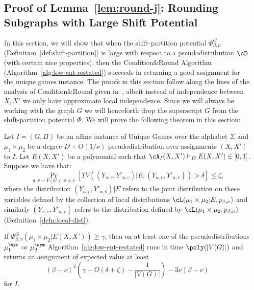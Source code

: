 \subsection{Proof of Lemma~\ref{lem:round-j}: Rounding Subgraphs with Large Shift Potential}
\label{sec:low-ent-j}
In this section, we will show that when the shift-partition potential $\Phi^G_{\beta,\nu}$ (Definition~\ref{def:shift-partition}) is large with respect to a pseudodistribution $\cD$ (with certain nice properties), then the Condition\&Round Algorithm  (Algorithm~\ref{alg:low-ent-restated}) succeeds in returning a good assignment for the unique games instance. The proofs in this section follow along the lines of the analysis of Condition\&Round given in~\cite{BBKSS}, albeit instead of independence between $X,X'$ we only have approximate local independence. Since we will always be working with the graph $G$ we will henceforth drop the superscript $G$ from the shift-partition potential $\Phi$.
We will prove the following theorem in this section:

\begin{lemma}\label{thm:round-j}
Let $I = (G, \Pi)$ be an affine instance of Unique Games over the alphabet $\Sigma$ and $\mu_1 \times \mu_2$ be a degree $D+\widetilde{O}(1/\nu)$ pseudodistribution over assignments $(X,X')$ to $I$. Let $E(X,X')$ be a polynomial such that $\cA_I(X,X') \vdash_D E(X,X') \in [0,1]$. Suppose we have that: 
\[\Pr_{u,v \sim V(G): u \neq v}[TV((Y_{u,v},Y'_{u,v})|E , (Y_{u,v},Y'_{u,v})) > \delta] \leq \zeta,\]
where the distribution $(Y_{u,v},Y'_{u,v})|E$ refers to the joint distribution on these variables defined by the collection of local distributions $\cL(\mu_1 \times \mu_2|E, p_{\beta,\nu})$ and similarly $(Y_{u,v},Y'_{u,v})$ refers to the distribution defined by $\cL(\mu_1 \times \mu_2,p_{\beta,\nu})$ (Definition~\ref{defn:local-dist}). 

If $\Phi^G_{\beta,\nu}(\mu_1 \times \mu_2 | E(X,X')) \geq \gamma$, then on at least one of the pseudodistributions $\mu^\sym_1$ or $\mu^\sym_2$ Algorithm~\ref{alg:low-ent-restated} runs in time $\poly(|V(G)|)$ and returns an assignment of expected value at least 
\[
(\beta - \nu)^2\left(\gamma - O(\delta+\zeta) - \frac{1}{|V(G)|}\right) - 3\nu(\beta - \nu)
\]
for $I$.
\end{lemma}


